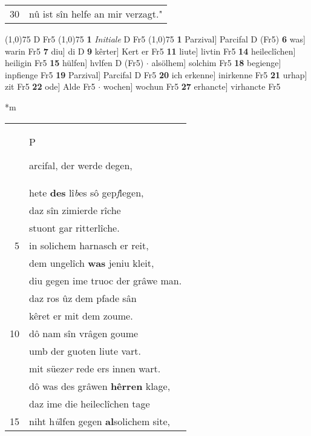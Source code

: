 \documentclass[8pt,a4paper,notitlepage]{article}
\begin{document}
\begin{table}[ht]
\begin{minipage}[t]{0.5\linewidth}
\begin{tabular}{rl}
30 & nû ist sîn helfe an mir verzagt."\\ 
\end{tabular}
\scriptsize
\line(1,0){75} \newline
D Fr5 \newline
\line(1,0){75} \newline
\textbf{1} \textit{Initiale} D Fr5  \newline
\line(1,0){75} \newline
\textbf{1} Parzival] Parcifal D (Fr5) \textbf{6} was] warin Fr5 \textbf{7} diu] di D \textbf{9} kêrter] Kert er Fr5 \textbf{11} liute] livtin Fr5 \textbf{14} heileclîchen] heiligin Fr5 \textbf{15} hülfen] hvlfen D (Fr5)  $\cdot$ alsölhem] solchim Fr5 \textbf{18} begienge] inpfienge Fr5 \textbf{19} Parzival] Parcifal D Fr5 \textbf{20} ich erkenne] inirkenne Fr5 \textbf{21} urhap] zit Fr5 \textbf{22} ode] Alde Fr5  $\cdot$ wochen] wochun Fr5 \textbf{27} erhancte] virhancte Fr5 \newline
\end{minipage}
\hspace{0.5cm}
\begin{minipage}[t]{0.5\linewidth}
\small
\begin{center}*m
\end{center}
\begin{tabular}{rl}
 & \begin{large}P\end{large}arcifal, der werde degen,\\ 
 & hete \textbf{des} lî\textit{b}es sô gep\textit{f}legen,\\ 
 & daz sîn zimierde rîche\\ 
 & stuont gar ritterlîche.\\ 
5 & in solichem harnasch er reit,\\ 
 & dem ungelîch \textbf{was} jeniu kleit,\\ 
 & diu gegen ime truoc der grâwe man.\\ 
 & daz ros ûz dem pfade sân\\ 
 & kêret er mit dem zoume.\\ 
10 & dô nam sîn vrâgen goume\\ 
 & umb der guoten liute vart.\\ 
 & mit süeze\textit{r} rede ers innen wart.\\ 
 & dô was des grâwen \textbf{hêrren} klage,\\ 
 & daz ime die heileclîchen tage\\ 
15 & niht h\textit{ü}lfen gegen \textbf{al}solichem site,\\ 

\end{tabular}
\end{minipage}
\end{table}
\end{document}

